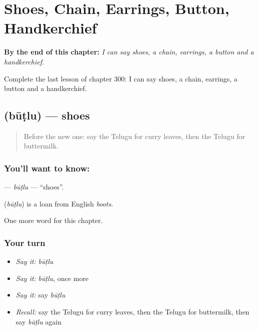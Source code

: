 
\chapter{Shoes, Chain, Earrings, Button, Handkerchief}
\label{ch:te-shoes-chain-earrings-button-handkerchief}

\begin{chapteropening}
\textbf{By the end of this chapter:} \emph{I can say shoes, a chain, earrings, a button and a handkerchief.}

Complete the last lesson of chapter 300: I can say shoes, a chain, earrings, a button and a handkerchief.
\end{chapteropening}

\section[\texorpdfstring{\te{బూట్లు} (būṭlu)}{బూట్లు (būṭlu)}]{ (būṭlu) — shoes}

\label{lesson:TE-C300-butlu}



\begin{quote}
Before the new one: say the Telugu for curry leaves, then the Telugu for buttermilk.
\end{quote}

\subsection*{You'll want to know: }
\textbf{} — \emph{būṭlu} — \textquotedblleft{}shoes\textquotedblright{}.

\begin{cousinweb}
\textbf{} (\emph{būṭlu}) is a loan from English \emph{boots}.
\end{cousinweb}

\begin{grammarlens}[title={What you've built}]
One more word for this chapter.
\end{grammarlens}

\subsection*{Your turn}
\begin{itemize}
\raggedright
  \item \emph{Say it:} \emph{būṭlu}
  \item \emph{Say it:} \emph{būṭlu}, once more
  \item \emph{Say it:} say \emph{būṭlu}
  \item \emph{Recall:} say the Telugu for curry leaves, then the Telugu for buttermilk, then say \emph{būṭlu} again
\end{itemize}

